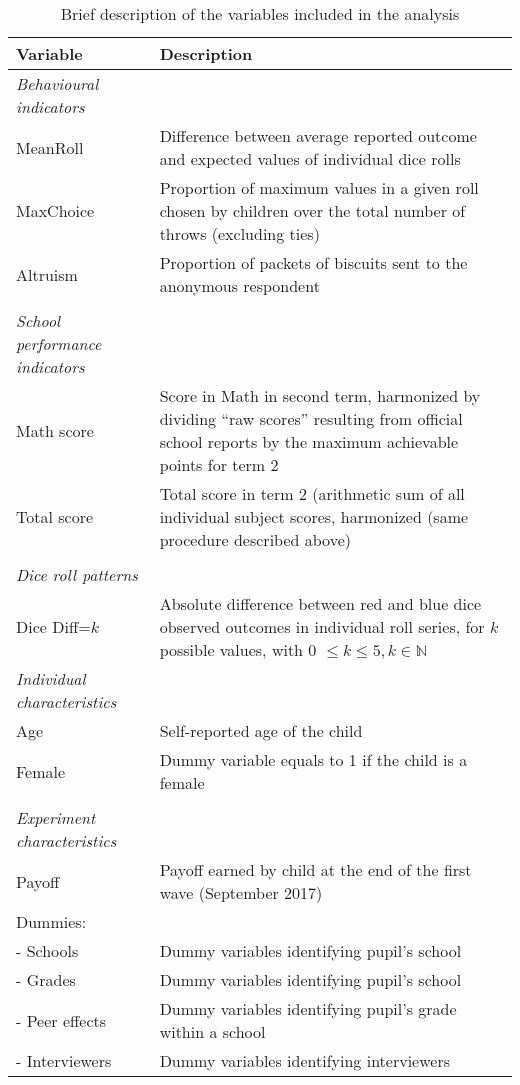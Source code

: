 \begin{table}[!h]\centering \caption{Brief description of the variables included in the analysis}
\renewcommand*{\arraystretch}{1}
\begin{tabular}{l p{9.5cm}}\toprule
\textbf{Variable} 			& \textbf{Description} 			\\ \midrule
\textit{Behavioural indicators} & \\
MeanRoll 					& Difference between average reported outcome and expected values of individual dice rolls	\\
MaxChoice 					& Proportion of maximum values in a given roll chosen by children over the total number of throws (excluding ties)						\\
Altruism 					& Proportion of packets of biscuits sent to the anonymous respondent						\\
&\\
\textit{School performance indicators} & \\
Math score					& Score in Math in second term, harmonized by dividing \enquote{raw scores} resulting from official school reports by the maximum achievable points for term 2 \\
Total score					& Total score in term 2 (arithmetic sum of all individual subject scores, harmonized (same procedure described above) \\
&\\ \midrule
\textit{Dice roll patterns} & \\
Dice Diff=$k$ 					& Absolute difference between red and blue dice observed outcomes in individual roll series, for $k$ possible values, with 0 $\le k \le 5, k\in\mathbb{N}$ \\
\textit{Individual characteristics}&			\\
Age 		 				& Self-reported age of the child								\\
Female 						& Dummy variable equals to 1 if the child is a female	\\
&\\
\textit{Experiment characteristics}&			\\
Payoff                      & Payoff earned by child at the end of the first wave (September 2017) \\
Dummies: & \\
- Schools              & Dummy variables identifying pupil's school \\
- Grades              & Dummy variables identifying pupil's school \\
- Peer effects  & Dummy variables identifying pupil's grade within a school \\
- Interviewers         & Dummy variables identifying interviewers \\
\bottomrule
\end{tabular} 
\label{tab:description}
\end{table}